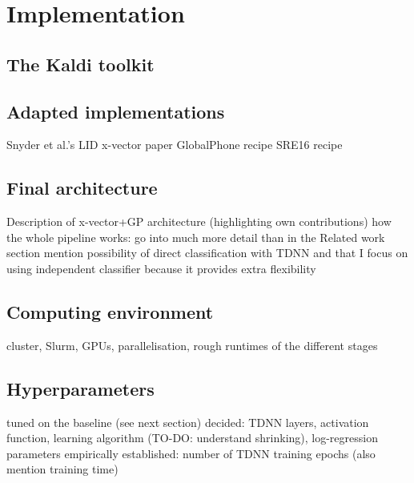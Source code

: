 \documentclass[bsc,frontabs,twoside,singlespacing,parskip,deptreport]{infthesis}
\begin{document}
\chapter{Implementation}{
  \section{The Kaldi toolkit}{

  }
  \section{Adapted implementations}{
    Snyder et al.'s LID x-vector paper
    GlobalPhone recipe
    SRE16 recipe
  }
  \section{Final architecture}{
    Description of x-vector+GP architecture (highlighting own contributions)
    how the whole pipeline works: go into much more detail than in the Related work section
    mention possibility of direct classification with TDNN and that I focus on using independent classifier because it provides extra flexibility
  }
  \section{Computing environment}{
    cluster, Slurm, GPUs, parallelisation, rough runtimes of the different stages
  }
  \section{Hyperparameters}{
    tuned on the baseline (see next section)
    decided: TDNN layers, activation function, learning algorithm (TO-DO: understand shrinking), log-regression parameters
    empirically established: number of TDNN training epochs (also mention training time)
  }
}
\end{document}

